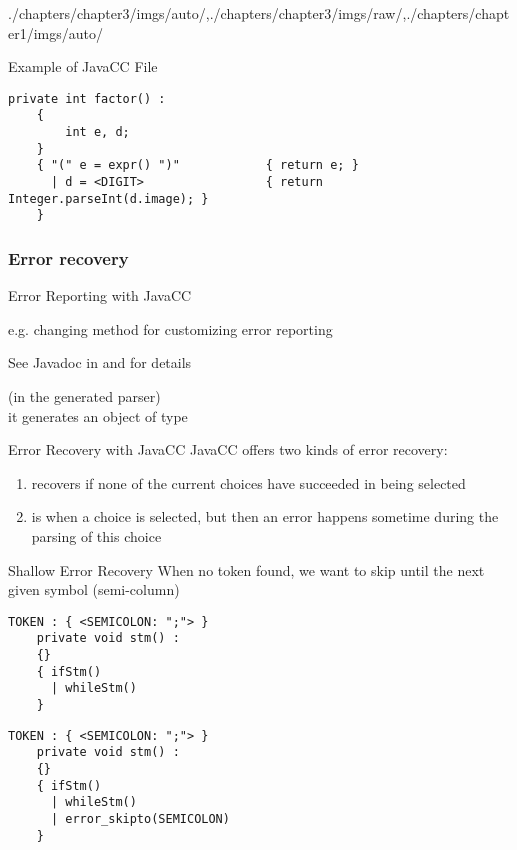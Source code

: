 \begin{graphicspathcontext}{{./chapters/chapter3/imgs/auto/},{./chapters/chapter3/imgs/raw/},{./chapters/chapter1/imgs/auto/}}
\begin{bibunit}[apalike]
\begin{frame}[fragile]{Example of JavaCC File }
\begin{lstlisting}[style=lststyle-java]
	private int factor() :
	{
	    int e, d;
	}
	{ "(" e = expr() ")"            { return e; }
	  | d = <DIGIT>                 { return Integer.parseInt(d.image); }
	}
	\end{lstlisting}
\end{frame}

\subsubsection{Error recovery}
\subsubsectiontableofcontentslide

\begin{frame}{Error Reporting with JavaCC}
	\begin{description}
	\item[Modify file ] e.g. changing   method for customizing error reporting
	\item See Javadoc in  and  for details
	\vfill
	\item [Override or call \ccode{generateParseException()}] (in the generated parser) \\
		it generates an object of type 
	\end{description}
\end{frame}

\begin{frame}{Error Recovery with JavaCC}
	JavaCC offers two kinds of error recovery:
	\vfill
	\begin{enumerate}
	\item[Shallow recovery] recovers if none of the current choices have succeeded in being selected
	\vfill
	\item[Deep recovery] is when a choice is selected, but then an error happens sometime during the parsing of this choice
	\end{enumerate}
\end{frame}

\begin{frame}[t,fragile]{Shallow Error Recovery}
	When no token found, we want to skip until the next given symbol (semi-column) \\
	\begin{lstlisting}[style=lststyle-java]
	TOKEN : { <SEMICOLON: ";"> }
	private void stm() :
	{}
	{ ifStm()
	  | whileStm()
	}
	\end{lstlisting}
	\begin{center}\end{center}
	\begin{lstlisting}[style=lststyle-java]
	TOKEN : { <SEMICOLON: ";"> }
	private void stm() :
	{}
	{ ifStm()
	  | whileStm()
	  | error_skipto(SEMICOLON)
	}
	\end{lstlisting}
\end{frame}


\end{bibunit}
\end{graphicspathcontext}
